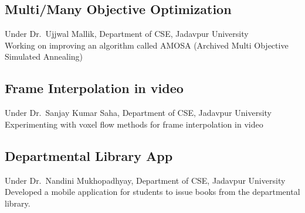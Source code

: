 \documentclass[]{deedy-resume-openfont}
\begin{document}
\begin{minipage}[t]{0.55\textwidth}
\subsection{Multi/Many Objective Optimization}
Under Dr.\ Ujjwal Mallik, 
Department of CSE, Jadavpur University\\
Working on improving an algorithm called AMOSA
(Archived Multi Objective Simulated Annealing)
\sectionsep


\subsection{Frame Interpolation in video}
Under Dr.\ Sanjay Kumar Saha,
Department of CSE, Jadavpur University\\
Experimenting with voxel flow methods for frame interpolation in video
\sectionsep

\subsection{Departmental Library App}
Under Dr.\ Nandini Mukhopadhyay,
Department of CSE, Jadavpur University\\
Developed a mobile application for students to issue books from
the departmental library.
\sectionsep


\end{minipage} 
\hfill
\end{document}

